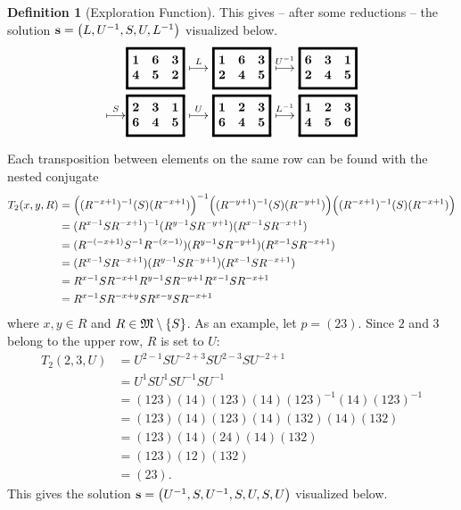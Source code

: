 \documentclass[a4paper,twoside,12pt,openany]{report}
\theoremstyle{plain}
\theoremstyle{definition}
\newtheorem{definition}{Definition}
\theoremstyle{remark}
\begin{document}
\begin{definition}[Exploration Function]
This gives -- after some reductions -- the solution \(\mathbf{s}=\left(L,U^{-1},S,U,L^{-1}\right)\) visualized below.
\begin{align*}
	& \gameboard[1 6 3 4 5 2]
	\overset{L}\gamemovearrow
	\gameboard[1 6 3 2 4 5]
	\overset{U\inv}\gamemovearrow
	\gameboard[6 3 1 2 4 5] \\
	\overset{S}\gamemovearrow
	& \gameboard[2 3 1 6 4 5]
	\overset{U}\gamemovearrow
	\gameboard[1 2 3 6 4 5]
	\overset{L\inv}\gamemovearrow
	\gameboard[1 2 3 4 5 6]
\end{align*}







Each transposition between elements on the same row can be found with the nested conjugate
\begin{align*}
T_2(x,y,R)
	&= \Bigl((R^{-x+1})^{-1}(S)(R^{-x+1})\Bigl)^{-1}\Bigl((R^{-y+1})^{-1}(S)(R^{-y+1})\Bigl)\Bigl((R^{-x+1})^{-1}(S)(R^{-x+1})\Bigl) \\
	&= (R^{x-1}SR^{-x+1})^{-1}(R^{y-1}SR^{-y+1})(R^{x-1}SR^{-x+1}) \\
	&= (R^{-(-x+1)}S^{-1} R^{-(x-1)})(R^{y-1}SR^{-y+1})(R^{x-1}SR^{-x+1}) \\
	&= (R^{x-1}SR^{-x+1})(R^{y-1}SR^{-y+1})(R^{x-1}SR^{-x+1}) \\
	&= R^{x-1}SR^{-x+1}R^{y-1}SR^{-y+1}R^{x-1}SR^{-x+1} \\
	&= R^{x-1}SR^{-x+y}SR^{x-y}SR^{-x+1}
\end{align*}
where \(x,y \in R\) and \(R\in \mathfrak{M}\setminus \{S\}\).
As an example, let \(p=(23)\). Since \(2\) and \(3\) belong to the upper row, \(R\) is set to \(U\):
\begin{align*}
T_2(2,3,U)
	&= U^{2-1}SU^{-2+3}SU^{2-3}SU^{-2+1} \\
	&= U^{1}SU^{1}SU^{-1}SU^{-1} \\
	&= (123)(14)(123)(14)(123)^{-1}(14)(123)^{-1} \\
	&= (123)(14)(123)(14)(132)(14)(132) \\
	&= (123)(14)(24)(14)(132) \\
	&= (123)(12)(132) \\
	&= (23).
\end{align*}
This gives the solution \(\mathbf{s}=\left(U^{-1},S,U^{-1},S,U,S,U\right)\) visualized below.
\begin{align*}

\end{align*}
\end{definition}
\end{document}
